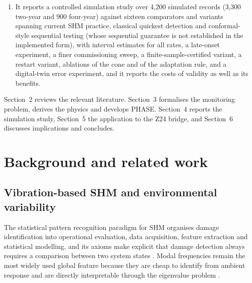 \documentclass[12pt,a4paper]{article}
\newcommand{\rtwo}[1]{#1}
\newcommand{\rtwo}[1]{{\color{revcolb}#1}}
\begin{document}
\begin{enumerate}
\item \rtwo{It reports a controlled simulation study over \rtwo{4{,}200 simulated records (3{,}300 two-year and 900 four-year)} against sixteen comparators and variants spanning current SHM practice, classical quickest detection and \rtwo{conformal-style sequential testing (whose sequential guarantee is not established in the implemented form)}, \rtwo{with interval estimates for all rates, a late-onset experiment, a finer commissioning sweep, a finite-sample-certified variant, a restart variant, ablations of the cone and of the adaptation rule, and a digital-twin error experiment}, and it reports the costs of validity as well as its benefits.}
\end{enumerate}

Section~2 reviews the relevant literature. Section~3 formalises the monitoring problem, derives the physics and develops PHASE. Section~4 reports the simulation study, Section~5 the application to the Z24 bridge, and Section~6 discusses implications and concludes.

\section{Background and related work}\label{sec:related}

\subsection{Vibration-based SHM and environmental variability}\label{sec:related-shm}

The statistical pattern recognition paradigm for SHM \citep{farrar2007intro,farrar2012machine} organises damage identification into operational evaluation, data acquisition, feature extraction and statistical modelling, and its axioms make explicit that damage detection always requires a comparison between two system states \citep{worden2007axioms}. Modal frequencies remain the most widely used global feature because they are cheap to identify from ambient response and are directly interpretable through the eigenvalue problem \citep{doebling1998summary,avci2021review}.
\end{document}
